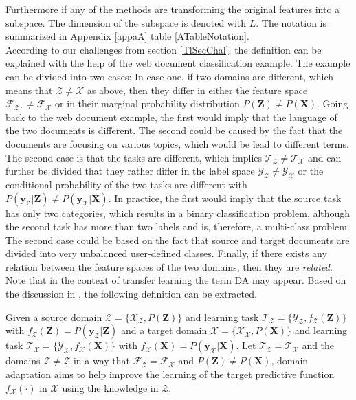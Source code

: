 Furthermore if any of the methods are transforming the original features into a subspace. The dimension of the subspace is denoted with $L$.
The notation is summarized in Appendix \ref{appaA} table \ref{ATableNotation}.\\
According to our challenges from section \ref{TlSecChal}, the definition can be explained with the help of the web document classification example.\cite[p. 4]{Weiss.2016}
The example can be divided into two cases:
In case one, if two domains are different, which means that $\mathcal{Z} \neq \mathcal{X}$ as above, then they differ in either the feature space $\mathcal{F_Z}, \neq \mathcal{F_X}$ or in their marginal probability distribution $P(\mathbf{Z}) \neq P(\mathbf{X})$.
Going back to the web document example, the first would imply that the language of the two documents is different.
The second could be caused by the fact that the documents are focusing on various topics, which would be lead to different terms.\cite{Pan.2010}\\
The second case is that the tasks are different, which implies $\mathcal{T_Z} \neq \mathcal{T_X}$ and can further be divided that they rather differ in the label space $\mathcal{Y_Z} \neq \mathcal{Y_X}$ or the conditional probability of the two tasks are different with $P(\mathbf{y}_\mathcal{Z}\vert \mathbf{Z}) \neq P(\mathbf{y}_\mathcal{X}\vert \mathbf{X})$.
In practice, the first would imply that the source task has only two categories, which results in a binary classification problem, although the second task has more than two labels and is, therefore, a multi-class problem.
The second case could be based on the fact that source and target documents are divided into very unbalanced user-defined classes.
Finally, if there exists any relation between the feature spaces of the two domains, then they are \textit{related}.\cite{Pan.2010}\\
Note that in the context of transfer learning the term \ac{DA} may appear.
Based on the discussion in \cite{Pan.2011}, the following definition can be extracted.
\begin{mDef}\label{DefDa}
	Given a source domain $\mathcal{Z}=\{\mathcal{X}_\mathcal{Z},P(\mathbf{Z})\}$ and learning task $\mathcal{T_Z}=\{\mathcal{Y_Z},f_\mathcal{Z}(\mathbf{Z})\}$ with $f_\mathcal{Z}(\mathbf{Z}) = P(\mathbf{y}_\mathcal{Z}|\mathbf{Z})$ and a target domain $\mathcal{X}=\{\mathcal{X}_\mathcal{X},P(\mathbf{X})\}$ and learning task $\mathcal{T_X}=\{\mathcal{Y_X},f_\mathcal{X}(\mathbf{X})\}$ with $f_\mathcal{X}(\mathbf{X}) = P(\mathbf{y}_\mathcal{X}|\mathbf{X})$. Let $\mathcal{T_Z} = \mathcal{T_X}$ and the domains $\mathcal{Z} \neq \mathcal{Z}$ in a way that $\mathcal{F}_\mathcal{Z} = \mathcal{F}_\mathcal{X}$ and $P(\mathbf{Z}) \neq P(\mathbf{X})$, domain adaptation aims to help improve the learning of the target predictive function $f_\mathcal{X}(\cdot)$ in $\mathcal{X}$ using the knowledge in $\mathcal{Z}$.
\end{mDef}
